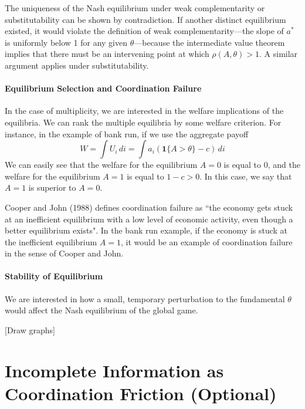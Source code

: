 \documentclass[12pt]{article}
\begin{document}
The uniqueness of the Nash equilibrium under weak complementarity or substitutability can be shown by contradiction. If another distinct equilibrium existed, it would violate the definition of weak complementarity---the slope of $a^*$ is uniformly below 1 for any given $\theta$---because the intermediate value theorem implies that there must be an intervening point at which $\rho(A, \theta) > 1$. A similar argument applies under substitutability.

\paragraph{Equilibrium Selection and Coordination Failure \\ [6pt]}

In the case of multiplicity, we are interested in the welfare implications of the equilibria. We can rank the multiple equilibria by some welfare criterion. For instance, in the example of bank run, if we use the aggregate payoff 
\[W = \int U_i \, di = \int a_i (\mathbf{1}\{A > \theta\} -c) \, di \]
We can easily see that the welfare for the equilibrium $A = 0$ is equal to 0, and the welfare for the equilibrium $A = 1$ is equal to $1-c > 0$. In this case, we say that $A = 1$ is superior to $A = 0$. 

Cooper and John (1988) defines coordination failure as ``the economy gets stuck at an inefficient equilibrium with a low level of economic activity, even though a better equilibrium exists". In the bank run example, if the economy is stuck at the inefficient equilibrium $A = 1$, it would be an example of coordination failure in the sense of Cooper and John.

\paragraph{Stability of Equilibrium \\ [6pt]}

We are interested in how a small, temporary perturbation to the fundamental $\theta$ would affect the Nash equilibrium of the global game. 

[Draw graphs]

\section{Incomplete Information as Coordination Friction (Optional)}
\end{document}
